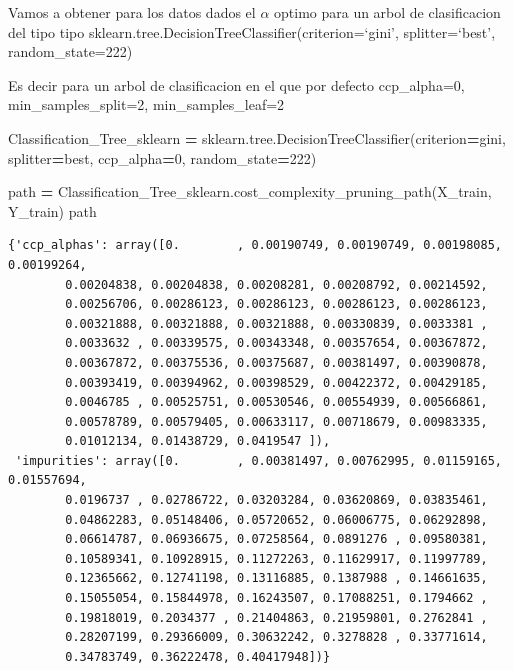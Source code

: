 \documentclass[
  11pt,
  a4paper,
]{article}
\newenvironment{Shaded}{\begin{snugshade}}{\end{snugshade}}
\newcommand{\DecValTok}[1]{\textcolor[rgb]{0.00,0.00,0.81}{#1}}
\newcommand{\NormalTok}[1]{#1}
\newcommand{\OperatorTok}[1]{\textcolor[rgb]{0.81,0.36,0.00}{\textbf{#1}}}
\newcommand{\StringTok}[1]{\textcolor[rgb]{0.31,0.60,0.02}{#1}}
\begin{document}
Vamos a obtener para los datos dados el \(\alpha\) optimo para un arbol
de clasificacion del tipo tipo
sklearn.tree.DecisionTreeClassifier(criterion=`gini', splitter=`best',
random\_state=222)

Es decir para un arbol de clasificacion en el que por defecto
ccp\_alpha=0, min\_samples\_split=2, min\_samples\_leaf=2

\begin{Shaded}
\begin{Highlighting}[]
\NormalTok{Classification\_Tree\_sklearn }\OperatorTok{=}\NormalTok{  sklearn.tree.DecisionTreeClassifier(criterion}\OperatorTok{=}\StringTok{\textquotesingle{}gini\textquotesingle{}}\NormalTok{, splitter}\OperatorTok{=}\StringTok{\textquotesingle{}best\textquotesingle{}}\NormalTok{, ccp\_alpha}\OperatorTok{=}\DecValTok{0}\NormalTok{, random\_state}\OperatorTok{=}\DecValTok{222}\NormalTok{)}

\NormalTok{path }\OperatorTok{=}\NormalTok{ Classification\_Tree\_sklearn.cost\_complexity\_pruning\_path(X\_train, Y\_train)}
\NormalTok{path}
\end{Highlighting}
\end{Shaded}

\begin{verbatim}
{'ccp_alphas': array([0.        , 0.00190749, 0.00190749, 0.00198085, 0.00199264,
        0.00204838, 0.00204838, 0.00208281, 0.00208792, 0.00214592,
        0.00256706, 0.00286123, 0.00286123, 0.00286123, 0.00286123,
        0.00321888, 0.00321888, 0.00321888, 0.00330839, 0.0033381 ,
        0.0033632 , 0.00339575, 0.00343348, 0.00357654, 0.00367872,
        0.00367872, 0.00375536, 0.00375687, 0.00381497, 0.00390878,
        0.00393419, 0.00394962, 0.00398529, 0.00422372, 0.00429185,
        0.0046785 , 0.00525751, 0.00530546, 0.00554939, 0.00566861,
        0.00578789, 0.00579405, 0.00633117, 0.00718679, 0.00983335,
        0.01012134, 0.01438729, 0.0419547 ]),
 'impurities': array([0.        , 0.00381497, 0.00762995, 0.01159165, 0.01557694,
        0.0196737 , 0.02786722, 0.03203284, 0.03620869, 0.03835461,
        0.04862283, 0.05148406, 0.05720652, 0.06006775, 0.06292898,
        0.06614787, 0.06936675, 0.07258564, 0.0891276 , 0.09580381,
        0.10589341, 0.10928915, 0.11272263, 0.11629917, 0.11997789,
        0.12365662, 0.12741198, 0.13116885, 0.1387988 , 0.14661635,
        0.15055054, 0.15844978, 0.16243507, 0.17088251, 0.1794662 ,
        0.19818019, 0.2034377 , 0.21404863, 0.21959801, 0.2762841 ,
        0.28207199, 0.29366009, 0.30632242, 0.3278828 , 0.33771614,
        0.34783749, 0.36222478, 0.40417948])}
\end{verbatim}
\end{document}
